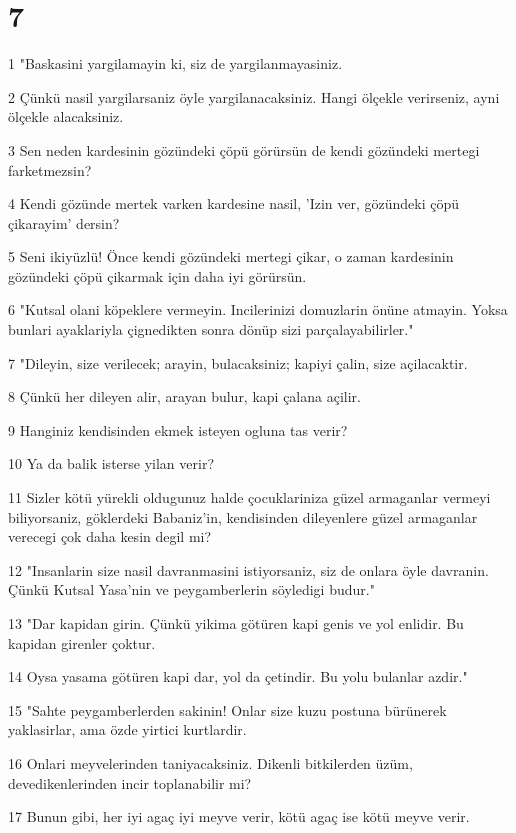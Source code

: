 \chapter{7}

\par 1 "Baskasini yargilamayin ki, siz de yargilanmayasiniz.
\par 2 Çünkü nasil yargilarsaniz öyle yargilanacaksiniz. Hangi ölçekle verirseniz, ayni ölçekle alacaksiniz.
\par 3 Sen neden kardesinin gözündeki çöpü görürsün de kendi gözündeki mertegi farketmezsin?
\par 4 Kendi gözünde mertek varken kardesine nasil, 'Izin ver, gözündeki çöpü çikarayim' dersin?
\par 5 Seni ikiyüzlü! Önce kendi gözündeki mertegi çikar, o zaman kardesinin gözündeki çöpü çikarmak için daha iyi görürsün.
\par 6 "Kutsal olani köpeklere vermeyin. Incilerinizi domuzlarin önüne atmayin. Yoksa bunlari ayaklariyla çignedikten sonra dönüp sizi parçalayabilirler."
\par 7 "Dileyin, size verilecek; arayin, bulacaksiniz; kapiyi çalin, size açilacaktir.
\par 8 Çünkü her dileyen alir, arayan bulur, kapi çalana açilir.
\par 9 Hanginiz kendisinden ekmek isteyen ogluna tas verir?
\par 10 Ya da balik isterse yilan verir?
\par 11 Sizler kötü yürekli oldugunuz halde çocuklariniza güzel armaganlar vermeyi biliyorsaniz, göklerdeki Babaniz'in, kendisinden dileyenlere güzel armaganlar verecegi çok daha kesin degil mi?
\par 12 "Insanlarin size nasil davranmasini istiyorsaniz, siz de onlara öyle davranin. Çünkü Kutsal Yasa'nin ve peygamberlerin söyledigi budur."
\par 13 "Dar kapidan girin. Çünkü yikima götüren kapi genis ve yol enlidir. Bu kapidan girenler çoktur.
\par 14 Oysa yasama götüren kapi dar, yol da çetindir. Bu yolu bulanlar azdir."
\par 15 "Sahte peygamberlerden sakinin! Onlar size kuzu postuna bürünerek yaklasirlar, ama özde yirtici kurtlardir.
\par 16 Onlari meyvelerinden taniyacaksiniz. Dikenli bitkilerden üzüm, devedikenlerinden incir toplanabilir mi?
\par 17 Bunun gibi, her iyi agaç iyi meyve verir, kötü agaç ise kötü meyve verir.
